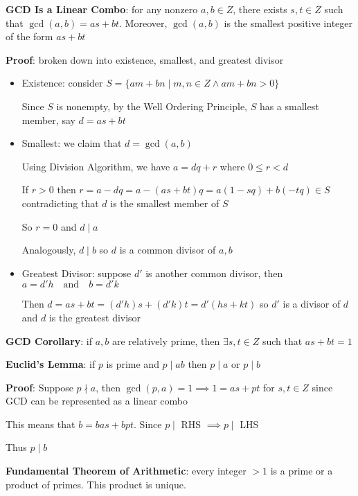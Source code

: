 \documentclass{article}
\begin{document}
  \bigskip
  
  \textbf{GCD Is a Linear Combo}: for any nonzero $a, b \in Z$, there exists $s, t \in Z$ such that $\gcd(a, b) = as + bt$. Moreover, $\gcd(a, b)$ is the smallest positive integer of the form $as + bt$

  \textbf{Proof}: broken down into existence, smallest, and greatest divisor

  \begin{itemize}
    \item Existence: consider $S = \{am + bn \mid m, n \in Z \wedge am + bn > 0\}$

      Since $S$ is nonempty, by the Well Ordering Principle, $S$ has a smallest member, say $d = as + bt$
    \item Smallest: we claim that $d = \gcd(a, b)$

    Using Division Algorithm, we have $a = dq + r$ where $0 \leq r < d$

    If $r > 0$ then $r = a - dq = a - (as + bt)q = a(1-sq) + b(-tq) \in S$ contradicting that $d$ is the smallest member of $S$

    So $r = 0$ and $d \mid a$

    Analogously, $d \mid b$ so $d$ is a common divisor of $a,b$
    \item Greatest Divisor: suppose $d'$ is another common divisor, then $a = d' h \quad \text{and} \quad b=d'k$

   Then $d = as + bt = (d'h)s + (d'k)t = d'(hs + kt)$ so $d'$ is a divisor of $d$ and $d$ is the greatest divisor
 \end{itemize}

 \textbf{GCD Corollary}: if $a,b$ are relatively prime, then $\exists s, t\in Z$ such that $as + bt = 1$

 \bigskip

 \textbf{Euclid's Lemma}: if $p$ is prime and $p \mid ab$ then $p \mid a$ or $p \mid b$

 \textbf{Proof}: Suppose $p \nmid a$, then $\gcd(p, a) = 1 \implies 1 = as + pt$ for $s, t \in Z$ since GCD can be represented as a linear combo

  This means that $b = bas + bpt$. Since $p \mid$ RHS $\implies p \mid$ LHS

  Thus $p \mid b$

  \bigskip

 \textbf{Fundamental Theorem of Arithmetic}: every integer $> 1$ is a prime or a product of primes. This product is unique.
\end{document}
